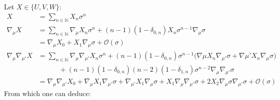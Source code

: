 \documentclass[a4paper,11pt]{article}
\numberwithin{equation}{section}
\theoremstyle{definition}
\begin{document}
Let $X \in \{U,V,W\}$:
\begin{align*}
    X &= \sum_{n \in \mathbb{N}} X_n \sigma^n\\
    \nabla_\mu X &= \sum_{n \in \mathbb{N}} \nabla_\mu X_n \sigma^n + (n-1)(1-\delta_{0,n}) X_n \sigma^{n-1} \nabla_\mu \sigma \\
    &= \nabla_\mu X_0 + X_1 \nabla_\mu \sigma + \mathcal{O}(\sigma)\\
    \nabla_\mu \nabla_{\mu'} X &= \sum_{n \in \mathbb{N}} \nabla_\mu \nabla_{\mu'} X_n \sigma^n + (n-1) (1-\delta_{0,n}) \sigma^{n-1} \big(  \nabla \mu X_n  \nabla_{\mu'} \sigma + \nabla {\mu'} X_n \nabla_\mu \sigma \big)\\
    &\quad \quad \quad + (n-1)(1-\delta_{0,n}) (n-2)(1-\delta_{1,n}) \sigma^{n-2} \nabla_\mu\nabla_{\mu'} \sigma\\
    &= \nabla_\mu\nabla_{\mu'} X_0 + \nabla_\mu X_1 \nabla_{\mu'} \sigma + \nabla_{\mu'} X_1 \nabla_\mu \sigma + X_1 \nabla_\mu\nabla_{\mu'} \sigma + 2 X_2 \nabla_\mu \sigma \nabla_{\mu'} \sigma+ \mathcal{O}(\sigma)
\end{align*}
From which one can deduce:
\end{document}
